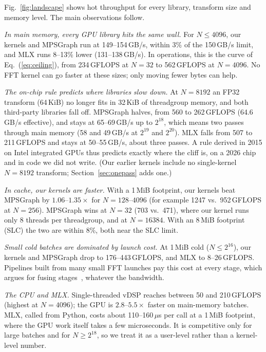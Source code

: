 \documentclass[conference]{IEEEtran}
\newcommand{\GF}{\,GFLOPS}
\begin{document}
Fig.~\ref{fig:landscape} shows hot throughput for every library, transform size and memory level. The
main observations follow.

\textit{In main memory, every GPU library hits the same wall.} For $N\le4096$, our kernels and MPSGraph
run at 149--154\,GB/s, within 3\% of the 150\,GB/s limit, and MLX runs 8--13\% lower (131--138\,GB/s).
In operations, this is the curve of Eq.~(\ref{eq:ceiling}), from 234\GF{} at $N=32$ to 562\GF{} at
$N=4096$. No FFT kernel can go faster at these sizes; only moving fewer bytes can help.

\textit{The on-chip rule predicts where libraries slow down.} At $N=8192$ an FP32 transform (64\,KiB) no
longer fits in 32\,KiB of threadgroup memory, and both third-party libraries fall off. MPSGraph halves,
from 560 to 262\GF{} (64.6\,GB/s effective), and stays at 65--69\,GB/s up to $2^{18}$, which means two
passes through main memory (58 and 49\,GB/s at $2^{19}$ and $2^{20}$). MLX falls from 507 to 211\GF{}
and stays at 50--55\,GB/s, about three passes. A rule derived in 2015 on Intel integrated GPUs thus
predicts exactly where the cliff is, on a 2026 chip and in code we did not write. (Our earlier kernels
include no single-kernel $N=8192$ transform; Section~\ref{sec:onepass} adds one.)

\textit{In cache, our kernels are faster.} With a 1\,MiB footprint, our kernels beat MPSGraph by
$1.06$--$1.35\times$ for $N=128$--$4096$ (for example 1247 vs.\ 952\GF{} at $N=256$). MPSGraph wins at
$N=32$ (703 vs.\ 471), where our kernel runs only 8 threads per threadgroup, and at $N=16384$. With an
8\,MiB footprint (SLC) the two are within 8\%, both near the SLC limit.

\textit{Small cold batches are dominated by launch cost.} At 1\,MiB cold ($N\le2^{16}$), our kernels and
MPSGraph drop to 176--443\GF{}, and MLX to 8--26\GF{}. Pipelines built from many small FFT launches pay
this cost at every stage, which argues for fusing stages~\cite{bergach2026sar}, whatever the bandwidth.

\textit{The CPU and MLX.} Single-threaded vDSP reaches between 50 and 210\GF{} (highest at $N=4096$);
the GPU is $2.8$--$5.5\times$ faster on main-memory batches. MLX, called from Python, costs about
110--160\,$\mu$s per call at a 1\,MiB footprint, where the GPU work itself takes a few microseconds. It is
competitive only for large batches and for $N\ge2^{18}$, so we treat it as a user-level rather than a
kernel-level number.

\end{document}
